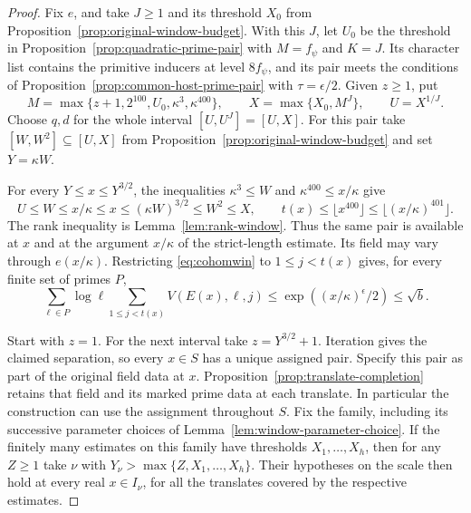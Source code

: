 \begin{proof}
Fix \(e\), and take \(J\ge1\) and its threshold \(X_0\) from
Proposition~\ref{prop:original-window-budget}. With this \(J\), let
\(U_0\) be the threshold in Proposition~\ref{prop:quadratic-prime-pair}
with \(M=f_\psi\) and \(K=J\). Its character list contains the
primitive inducers at level \(8f_\psi\), and its pair meets the
conditions of Proposition~\ref{prop:common-host-prime-pair} with
\(\tau=\epsilon/2\). Given \(z\ge1\), put
\[
 M=\max\{z+1,2^{100},U_0,\kappa^3,\kappa^{400}\},
 \qquad X=\max\{X_0,M^J\},\qquad U=X^{1/J}.
\]
Choose \(q,d\) for the whole interval \([U,U^J]=[U,X]\).
For this pair take \([W,W^2]\subseteq[U,X]\) from
Proposition~\ref{prop:original-window-budget} and set \(Y=\kappa W\).

For every \(Y\le x\le Y^{3/2}\), the inequalities
\(\kappa^3\le W\) and \(\kappa^{400}\le x/\kappa\) give
\[
 U\le W\le x/\kappa\le x\le(\kappa W)^{3/2}\le W^2\le X,
 \qquad
 t(x)\le\lfloor x^{400}\rfloor\le\lfloor(x/\kappa)^{401}\rfloor .
\]
The rank inequality is Lemma~\ref{lem:rank-window}.
Thus the same pair is available at \(x\) and at the argument
\(x/\kappa\) of the strict-length estimate. Its field may vary
through \(e(x/\kappa)\). Restricting \eqref{eq:cohomwin} to
\(1\le j<t(x)\) gives, for every finite set of primes \(P\),
\[
 \sum_{\ell\in P}\log\ell\sum_{1\le j<t(x)}
             V(E(x),\ell,j)\le \exp((x/\kappa)^\epsilon/2)\le\sqrt b .
\]

Start with \(z=1\). For the next interval take \(z=Y^{3/2}+1\). Iteration gives the claimed
separation, so every \(x\in S\) has a unique assigned pair. Specify
this pair as part of the original field data at \(x\).
Proposition~\ref{prop:translate-completion} retains that field and its
marked prime data at each translate. In particular the construction
can use the assignment throughout \(S\). Fix the family, including
its successive parameter choices of Lemma~\ref{lem:window-parameter-choice}.
If the finitely many estimates on this family have thresholds
\(X_1,\dots,X_h\), then for any \(Z\ge1\) take \(\nu\) with
\(Y_\nu>\max\{Z,X_1,\dots,X_h\}\). Their hypotheses on the scale
then hold at every real \(x\in I_\nu\), for all the translates
covered by the respective estimates.
\end{proof}

